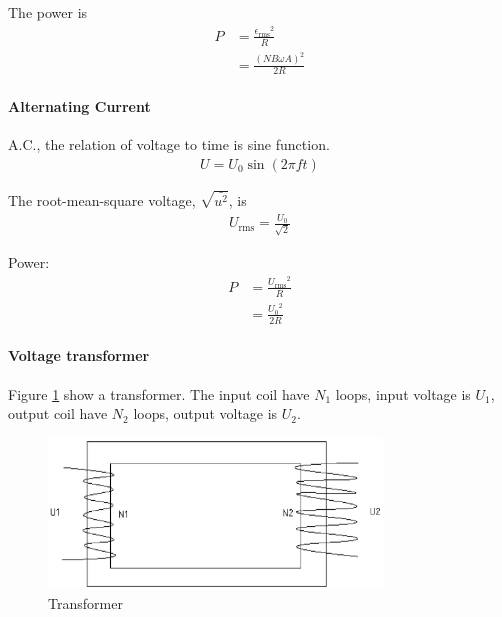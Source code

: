             The power is
            \begin{align}
                P &= \frac{{\epsilon_{\mathrm{rms}}}^2}{R}\\
                  &= \frac{(N B \omega A)^2}{2 R}
            \end{align}

        \paragraph{Alternating Current}
            A.C., the relation of voltage to time is sine function. 
            \begin{align}
                U = U_0 \sin (2 \pi f t)
            \end{align}

            The root-mean-square voltage, $\sqrt{\bar{u^2}}$, is
            \begin{align}
                U_{\mathrm{rms}} = \frac{U_0}{\sqrt{2}}
            \end{align}

            Power:
            \begin{align}
                P &= \frac{{U_{\mathrm{rms}}}^2}{R} \\
                  &= \frac{{U_0}^2}{2 R}
            \end{align}

        \paragraph{Voltage transformer}
            Figure \ref{transformer} show a transformer. The input coil have $N_1$ loops, input voltage is $U_1$, output coil have $N_2$ loops, output voltage is $U_2$.

            \begin{figure}[H]
                \begin{center}
                    \includegraphics[height=4cm]{electromagnetism_charts/transformer.eps}
                \end{center}
                \caption{Transformer}
                \label{transformer}
            \end{figure}

